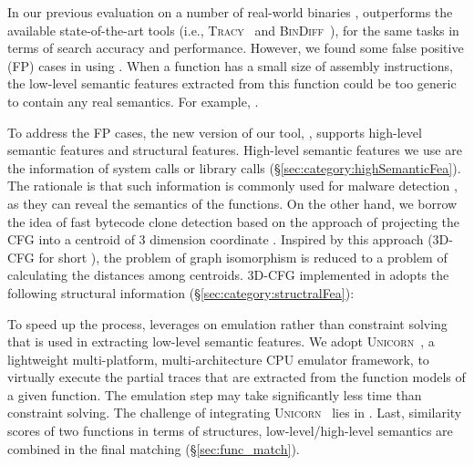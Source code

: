 In our previous evaluation on a number of real-world binaries \cite{bingo}, \tool outperforms the available state-of-the-art tools (i.e., \textsc{Tracy}~\cite{DBLP:conf/pldi/DavidY14} and \textsc{BinDiff}~\cite{DBLP:conf/dimva/Flake04}),  for the same tasks in terms of search accuracy and performance. %
However, we found some false positive (FP) cases in using \tool. When a function has a small size of assembly instructions, the low-level semantic features extracted from this function could be too generic to contain any real semantics. For example, . %

To address the FP cases, the new version of our tool, \toolNew, supports high-level semantic features and structural features. High-level semantic features we use are the information of system calls or library calls (\S \ref{sec:category:highSemanticFea}). The rationale is that such information is commonly used for malware detection \cite{DBLP:conf/issta/CanaliLBKCK12}, as they can reveal the semantics of the functions. On the other hand, we borrow the idea of fast bytecode clone detection based on the approach of projecting the CFG  into a  centroid of 3 dimension coordinate \cite{DBLP:conf/icse/ChenLZ14}. Inspired by this approach (3D-CFG for short \cite{DBLP:conf/icse/ChenLZ14}), the problem of graph isomorphism is reduced to a problem of calculating the distances among centroids. 3D-CFG implemented in  \toolNew adopts the following structural information (\S \ref{sec:category:structralFea}): 

To speed up the process, \toolNew leverages on emulation rather than  constraint solving that is used in extracting low-level semantic features. %
We adopt \textsc{Unicorn}~\cite{unicorn}, a lightweight multi-platform, multi-architecture CPU emulator framework, to virtually execute the partial traces that are extracted from the function models of a given function. The emulation step may take significantly less time than constraint solving. The challenge of integrating \textsc{Unicorn}~\cite{unicorn} lies in . Last, similarity scores of two functions in terms of structures, low-level/high-level semantics are combined in the final matching (\S \ref{sec:func_match}).

